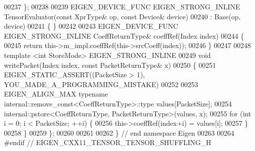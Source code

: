 \begin{DoxyCode}
00237   \};
00238 
00239   EIGEN\_DEVICE\_FUNC EIGEN\_STRONG\_INLINE TensorEvaluator(\textcolor{keyword}{const} XprType& op, \textcolor{keyword}{const} Device& device)
00240       : Base(op, device)
00241   \{ \}
00242 
00243   EIGEN\_DEVICE\_FUNC EIGEN\_STRONG\_INLINE CoeffReturnType& coeffRef(Index index)
00244   \{
00245     \textcolor{keywordflow}{return} this->m\_impl.coeffRef(this->srcCoeff(index));
00246   \}
00247 
00248   \textcolor{keyword}{template} <\textcolor{keywordtype}{int} StoreMode> EIGEN\_STRONG\_INLINE
00249   \textcolor{keywordtype}{void} writePacket(Index index, \textcolor{keyword}{const} PacketReturnType& x)
00250   \{
00251     EIGEN\_STATIC\_ASSERT((PacketSize > 1), YOU\_MADE\_A\_PROGRAMMING\_MISTAKE)
00252 
00253     EIGEN\_ALIGN\_MAX \textcolor{keyword}{typename} internal::remove\_const<CoeffReturnType>::type values[PacketSize];
00254     internal::pstore<CoeffReturnType, PacketReturnType>(values, x);
00255     \textcolor{keywordflow}{for} (\textcolor{keywordtype}{int} i = 0; i < PacketSize; ++i) \{
00256       this->coeffRef(index+i) = values[i];
00257     \}
00258   \}
00259 \};
00260 
00261 
00262 \} \textcolor{comment}{// end namespace Eigen}
00263 
00264 \textcolor{preprocessor}{#endif // EIGEN\_CXX11\_TENSOR\_TENSOR\_SHUFFLING\_H}
\end{DoxyCode}
